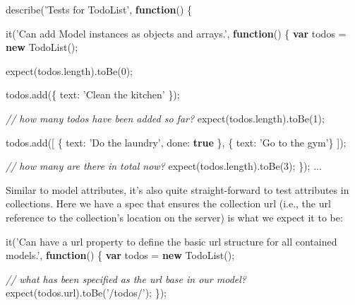 \documentclass[9pt]{book}
\newenvironment{Shaded}{}{}
\newcommand{\KeywordTok}[1]{\textcolor[rgb]{0.00,0.44,0.13}{\textbf{{#1}}}}
\newcommand{\DataTypeTok}[1]{\textcolor[rgb]{0.56,0.13,0.00}{{#1}}}
\newcommand{\DecValTok}[1]{\textcolor[rgb]{0.25,0.63,0.44}{{#1}}}
\newcommand{\StringTok}[1]{\textcolor[rgb]{0.25,0.44,0.63}{{#1}}}
\newcommand{\CommentTok}[1]{\textcolor[rgb]{0.38,0.63,0.69}{\textit{{#1}}}}
\newcommand{\OtherTok}[1]{\textcolor[rgb]{0.00,0.44,0.13}{{#1}}}
\newcommand{\FunctionTok}[1]{\textcolor[rgb]{0.02,0.16,0.49}{{#1}}}
\newcommand{\NormalTok}[1]{{#1}}
\begin{document}
\begin{Shaded}
\begin{Highlighting}[]
\FunctionTok{describe}\NormalTok{(}\StringTok{'Tests for TodoList'}\NormalTok{, }\KeywordTok{function}\NormalTok{() \{}

    \FunctionTok{it}\NormalTok{(}\StringTok{'Can add Model instances as objects and arrays.'}\NormalTok{, }\KeywordTok{function}\NormalTok{() \{}
        \KeywordTok{var} \NormalTok{todos = }\KeywordTok{new} \FunctionTok{TodoList}\NormalTok{();}

        \FunctionTok{expect}\NormalTok{(}\OtherTok{todos}\NormalTok{.}\FunctionTok{length}\NormalTok{).}\FunctionTok{toBe}\NormalTok{(}\DecValTok{0}\NormalTok{);}

        \OtherTok{todos}\NormalTok{.}\FunctionTok{add}\NormalTok{(\{ }\DataTypeTok{text}\NormalTok{: }\StringTok{'Clean the kitchen'} \NormalTok{\});}

        \CommentTok{// how many todos have been added so far?}
        \FunctionTok{expect}\NormalTok{(}\OtherTok{todos}\NormalTok{.}\FunctionTok{length}\NormalTok{).}\FunctionTok{toBe}\NormalTok{(}\DecValTok{1}\NormalTok{);}

        \OtherTok{todos}\NormalTok{.}\FunctionTok{add}\NormalTok{([}
            \NormalTok{\{ }\DataTypeTok{text}\NormalTok{: }\StringTok{'Do the laundry'}\NormalTok{, }\DataTypeTok{done}\NormalTok{: }\KeywordTok{true} \NormalTok{\},}
            \NormalTok{\{ }\DataTypeTok{text}\NormalTok{: }\StringTok{'Go to the gym'}\NormalTok{\}}
        \NormalTok{]);}

        \CommentTok{// how many are there in total now?}
        \FunctionTok{expect}\NormalTok{(}\OtherTok{todos}\NormalTok{.}\FunctionTok{length}\NormalTok{).}\FunctionTok{toBe}\NormalTok{(}\DecValTok{3}\NormalTok{);}
    \NormalTok{\});}
\NormalTok{...}
\end{Highlighting}
\end{Shaded}

Similar to model attributes, it's also quite straight-forward to test
attributes in collections. Here we have a spec that ensures the
collection url (i.e., the url reference to the collection's location on
the server) is what we expect it to be:

\begin{Shaded}
\begin{Highlighting}[]
\FunctionTok{it}\NormalTok{(}\StringTok{'Can have a url property to define the basic url structure for all contained models.'}\NormalTok{, }\KeywordTok{function}\NormalTok{() \{}
        \KeywordTok{var} \NormalTok{todos = }\KeywordTok{new} \FunctionTok{TodoList}\NormalTok{();}

        \CommentTok{// what has been specified as the url base in our model?}
        \FunctionTok{expect}\NormalTok{(}\OtherTok{todos}\NormalTok{.}\FunctionTok{url}\NormalTok{).}\FunctionTok{toBe}\NormalTok{(}\StringTok{'/todos/'}\NormalTok{);}
\NormalTok{\});}
\end{Highlighting}
\end{Shaded}
\end{document}
